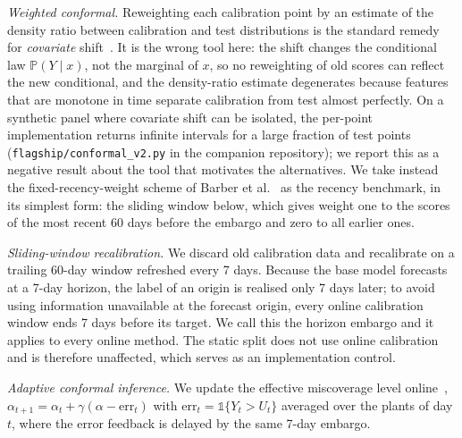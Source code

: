\documentclass[preprint,3p,times]{elsarticle}
\begin{document}
\emph{Weighted conformal.} Reweighting each calibration point by an estimate of the density ratio between calibration and test distributions is the standard remedy for \emph{covariate} shift~\cite{tibshirani2019}. It is the wrong tool here: the shift changes the conditional law $\mathbb{P}(Y\mid x)$, not the marginal of $x$, so no reweighting of old scores can reflect the new conditional, and the density-ratio estimate degenerates because features that are monotone in time separate calibration from test almost perfectly. On a synthetic panel where covariate shift can be isolated, the per-point implementation returns infinite intervals for a large fraction of test points (\texttt{flagship/conformal\_v2.py} in the companion repository); we report this as a negative result about the tool that motivates the alternatives. We take instead the fixed-recency-weight scheme of Barber et al.~\cite{barber2023} as the recency benchmark, in its simplest form: the sliding window below, which gives weight one to the scores of the most recent 60 days before the embargo and zero to all earlier ones.

\emph{Sliding-window recalibration.} We discard old calibration data and recalibrate on a trailing 60-day window refreshed every 7 days. Because the base model forecasts at a 7-day horizon, the label of an origin is realised only 7 days later; to avoid using information unavailable at the forecast origin, every online calibration window ends 7 days before its target. We call this the horizon embargo and it applies to every online method. The static split does not use online calibration and is therefore unaffected, which serves as an implementation control.

\emph{Adaptive conformal inference.} We update the effective miscoverage level online~\cite{gibbs2021}, $\alpha_{t+1}=\alpha_t+\gamma(\alpha-\mathrm{err}_t)$ with $\mathrm{err}_t=\mathbb{1}\{Y_t>U_t\}$ averaged over the plants of day $t$, where the error feedback is delayed by the same 7-day embargo.
\end{document}
